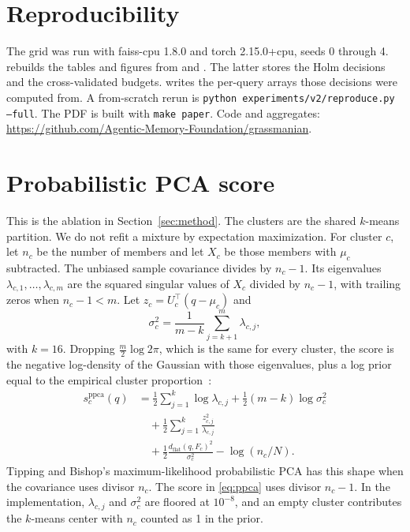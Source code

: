 \documentclass[sigconf,nonacm]{acmart}
\begin{document}
\section*{Reproducibility}
The grid was run with faiss-cpu 1.8.0 and torch 2.15.0+cpu, seeds 0 through 4.  rebuilds the tables and figures from  and . The latter stores the Holm decisions and the cross-validated budgets.  writes the per-query arrays those decisions were computed from. A from-scratch rerun is \texttt{python experiments/v2/reproduce.py --full}. The PDF is built with \texttt{make paper}. Code and aggregates: \url{https://github.com/Agentic-Memory-Foundation/grassmanian}.




\appendix
\section{Probabilistic PCA score}
\label{app:ppca}

This is the ablation in Section~\ref{sec:method}. The clusters are the shared $k$-means partition. We do not refit a mixture by expectation maximization. For cluster $c$, let $n_c$ be the number of members and let $X_c$ be those members with $\mu_c$ subtracted. The unbiased sample covariance divides by $n_c-1$. Its eigenvalues $\lambda_{c,1},\ldots,\lambda_{c,m}$ are the squared singular values of $X_c$ divided by $n_c-1$, with trailing zeros when $n_c-1 < m$. Let $z_c = U_c^\top(q-\mu_c)$ and
\begin{equation}
  \sigma_c^2 = \frac{1}{m-k}\sum_{j=k+1}^{m} \lambda_{c,j},
  \label{eq:sigma}
\end{equation}
with $k = 16$. Dropping $\tfrac{m}{2}\log 2\pi$, which is the same for every cluster, the score is the negative log-density of the Gaussian with those eigenvalues, plus a log prior equal to the empirical cluster proportion~\cite{tipping1999ppca,tipping1999mppca}:
\begin{equation}
\begin{aligned}
  s_c^{\mathrm{ppca}}(q)
  &= \tfrac12\sum_{j=1}^{k}\log\lambda_{c,j}
   + \tfrac12(m-k)\log\sigma_c^2 \\
  &\quad + \tfrac12\sum_{j=1}^{k}\frac{z_{c,j}^2}{\lambda_{c,j}} \\
  &\quad + \tfrac12\frac{d_{\mathrm{flat}}(q,F_c)^2}{\sigma_c^2}
   - \log(n_c/N).
\end{aligned}
\label{eq:ppca}
\end{equation}
Tipping and Bishop's maximum-likelihood probabilistic PCA has this shape when the covariance uses divisor $n_c$. The score in \eqref{eq:ppca} uses divisor $n_c-1$. In the implementation, $\lambda_{c,j}$ and $\sigma_c^2$ are floored at $10^{-8}$, and an empty cluster contributes the $k$-means center with $n_c$ counted as 1 in the prior.
\end{document}

